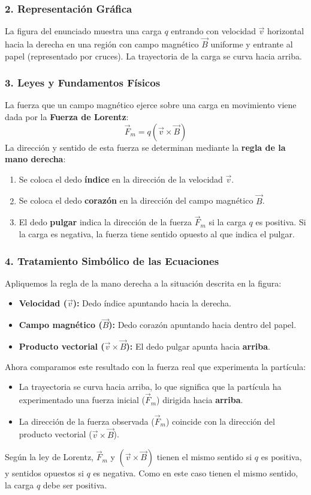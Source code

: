 \subsubsection*{2. Representación Gráfica}
La figura del enunciado muestra una carga $q$ entrando con velocidad $\vec{v}$ horizontal hacia la derecha en una región con campo magnético $\vec{B}$ uniforme y entrante al papel (representado por cruces). La trayectoria de la carga se curva hacia arriba.

\subsubsection*{3. Leyes y Fundamentos Físicos}
La fuerza que un campo magnético ejerce sobre una carga en movimiento viene dada por la \textbf{Fuerza de Lorentz}:
$$\vec{F}_m = q(\vec{v} \times \vec{B})$$
La dirección y sentido de esta fuerza se determinan mediante la \textbf{regla de la mano derecha}:
\begin{enumerate}
    \item Se coloca el dedo \textbf{índice} en la dirección de la velocidad $\vec{v}$.
    \item Se coloca el dedo \textbf{corazón} en la dirección del campo magnético $\vec{B}$.
    \item El dedo \textbf{pulgar} indica la dirección de la fuerza $\vec{F}_m$ si la carga $q$ es positiva. Si la carga es negativa, la fuerza tiene sentido opuesto al que indica el pulgar.
\end{enumerate}

\subsubsection*{4. Tratamiento Simbólico de las Ecuaciones}
Apliquemos la regla de la mano derecha a la situación descrita en la figura:
\begin{itemize}
    \item \textbf{Velocidad ($\vec{v}$):} Dedo índice apuntando hacia la derecha.
    \item \textbf{Campo magnético ($\vec{B}$):} Dedo corazón apuntando hacia dentro del papel.
    \item \textbf{Producto vectorial ($\vec{v} \times \vec{B}$):} El dedo pulgar apunta hacia \textbf{arriba}.
\end{itemize}
Ahora comparamos este resultado con la fuerza real que experimenta la partícula:
\begin{itemize}
    \item La trayectoria se curva hacia arriba, lo que significa que la partícula ha experimentado una fuerza inicial ($\vec{F}_m$) dirigida hacia \textbf{arriba}.
    \item La dirección de la fuerza observada ($\vec{F}_m$) coincide con la dirección del producto vectorial ($\vec{v} \times \vec{B}$).
\end{itemize}
Según la ley de Lorentz, $\vec{F}_m$ y $(\vec{v} \times \vec{B})$ tienen el mismo sentido si $q$ es positiva, y sentidos opuestos si $q$ es negativa. Como en este caso tienen el mismo sentido, la carga $q$ debe ser positiva.

